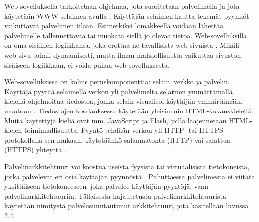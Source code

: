Web-sovelluksella tarkoitetaan ohjelmaa, jota suoritetaan palvelimella ja jota käytetään WWW-selaimen avulla \cite{uml}. Käyttäjän selaimen kautta tekemät pyynnöt vaikuttavat palvelimen tilaan. Esimerkiksi lomakkeella voidaan lähettää palvelimelle tallennettavaa tai muokata siellä jo olevaa tietoa. Web-sovelluksilla on oma sisäinen logiikkansa, joka erottaa ne tavallisista web-sivuista \cite{uml}. Mikäli web-sivu toimii dynaamisesti, mutta ilman mahdollisuutta vaikuttaa sivuston sisäiseen logiikkaan, ei voida puhua web-sovelluksesta.

Web-sovelluksissa on kolme peruskomponenttia: selain, verkko ja palvelin. Käyttäjä pyytää selaimella verkon yli palvelimelta selaimen ymmärtämällä kielellä ohjelmoitua tiedostoa, jonka selain visualisoi käyttäjän ymmärtämään muotoon \cite{uml}. Tiedostojen koodauksessa käytetään yleisimmin HTML-kuvauskielellä. Muita käytettyjä kieliä ovat mm. JavaScript ja Flash, joilla laajennetaan HTML-kielen toiminnallisuutta. Pyyntö tehdään verkon yli HTTP- tai HTTPS-protokollalla sen mukaan, käytetäänkö salaamatonta (HTTP) vai salattua (HTTPS) yhteyttä \cite{rfc2818}.

Palvelinarkkitehtuuri voi koostua useista fyysistä tai virtuaalisista tietokoneista, jotka palvelevat eri osia käyttäjän pyynnöstä \cite{soa}. Puhuttaessa palvelimesta ei viitata yksittäiseen tietokoneeseen, joka palvelee käyttäjän pyyntöjä, vaan palvelinarkkitehtuuriin. Tällaisesta hajautetusta palvelinarkkitehtuurista käytetään nimitystä palvelusuuntautunut arkkitehtuuri, jota käsitellään luvussa 2.4.